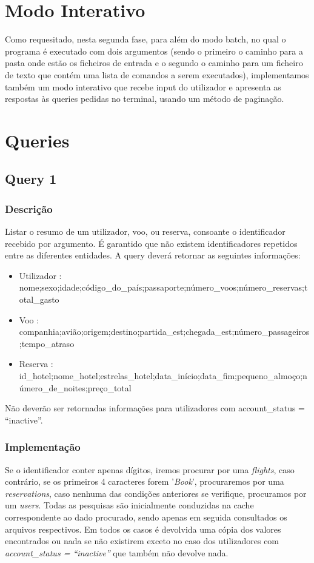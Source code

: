 \documentclass[11pt]{article}
\begin{document}
\newpage

\section{Modo Interativo}
Como requesitado, nesta segunda fase, para além do modo batch, no qual o programa é executado com dois argumentos (sendo o primeiro o caminho para a pasta onde estão os ficheiros de entrada e o segundo o caminho para um ficheiro de texto que contém uma lista de comandos a serem executados), implementamos também um modo interativo que recebe input do utilizador e apresenta as respostas às queries pedidas no terminal, usando um método de paginação.

\section{Queries}


\subsection{Query 1}
\subsubsection{Descrição}
Listar o resumo de um utilizador, voo, ou reserva, consoante o identificador recebido por
argumento. É garantido que não existem identificadores repetidos entre as diferentes entidades. A
query deverá retornar as seguintes informações:
\begin{itemize}
        \item Utilizador : nome;sexo;idade;código_do_país;passaporte;número_voos;número_reservas;total_gasto
        \item Voo : companhia;avião;origem;destino;partida_est;chegada_est;número_passageiros;tempo_atraso
        \item Reserva : id_hotel;nome_hotel;estrelas_hotel;data_início;data_fim;pequeno_almoço;número_de_noites;preço_total
\end{itemize}
Não deverão ser retornadas informações para utilizadores com account_status = “inactive”.
    
\subsubsection{Implementação}
Se o identificador conter apenas dígitos, iremos procurar por uma \textit{flights}, caso contrário, se os primeiros 4 caracteres forem '\textit{Book}', procuraremos por uma \textit{reservations}, caso nenhuma das condições anteriores se verifique, procuramos por um \textit{users}.
Todas as pesquisas são inicialmente conduzidas na cache correspondente ao dado procurado, sendo apenas em seguida consultados os arquivos respectivos.
Em todos os casos é devolvida uma cópia dos valores encontrados ou nada se não existirem exceto no caso dos utilizadores com \textit{account_status = “inactive”} que também não devolve nada.
\end{document}
